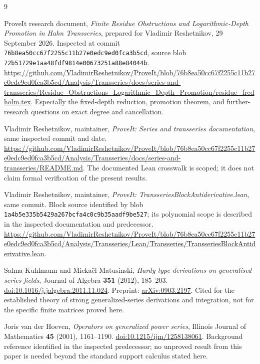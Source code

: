 \documentclass[11pt,a4paper]{article}
\numberwithin{equation}{section}
\theoremstyle{definition}
\theoremstyle{remark}
\theoremstyle{definition}
\newcommand{\snap}{76b8ea50cc67f2255c11b27e0edc9ed0fca3b5cd}
\begin{document}
\begin{thebibliography}{9}
\small\raggedright
{}
ProveIt research document, \emph{Finite Residue Obstructions and Logarithmic-Depth Promotion in Hahn Transseries}, prepared for Vladimir Reshetnikov, 29 September 2026. Inspected at commit \texttt{\snap}, source blob \texttt{72b51729e1aa48fdf9814e00673251a88e84044b}.
\url{https://github.com/VladimirReshetnikov/ProveIt/blob/76b8ea50cc67f2255c11b27e0edc9ed0fca3b5cd/Analysis/Transseries/docs/series-and-transseries/Residue_Obstructions_Logarithmic_Depth_Promotion/residue_fredholm.tex}.
Especially the fixed-depth reduction, promotion theorem, and further-research questions on exact degree and cancellation.

Vladimir Reshetnikov, maintainer, \emph{ProveIt: Series and transseries documentation}, same inspected commit and date.
\url{https://github.com/VladimirReshetnikov/ProveIt/blob/76b8ea50cc67f2255c11b27e0edc9ed0fca3b5cd/Analysis/Transseries/docs/series-and-transseries/README.md}.
The documented Lean crosswalk is scoped; it does not claim formal verification of the present results.

Vladimir Reshetnikov, maintainer, \emph{ProveIt: TransseriesBlockAntiderivative.lean}, same commit. Block source identified by blob \texttt{1a4b5e335b5429a267bcfa4c0c9b35aadf9be527}; its polynomial scope is described in the inspected documentation and predecessor.
\url{https://github.com/VladimirReshetnikov/ProveIt/blob/76b8ea50cc67f2255c11b27e0edc9ed0fca3b5cd/Analysis/Transseries/Lean/Transseries/TransseriesBlockAntiderivative.lean}.

Salma Kuhlmann and Micka\"el Matusinski,
\emph{Hardy type derivations on generalised series fields},
Journal of Algebra \textbf{351} (2012), 185--203.
\href{https://doi.org/10.1016/j.jalgebra.2011.11.024}{doi:10.1016/j.jalgebra.2011.11.024}.
Preprint: \href{https://arxiv.org/abs/0903.2197}{arXiv:0903.2197}.
Cited for the established theory of strong generalized-series derivations and integration, not for the specific finite matrices proved here.

Joris van der Hoeven,
\emph{Operators on generalized power series},
Illinois Journal of Mathematics \textbf{45} (2001), 1161--1190.
\href{https://doi.org/10.1215/ijm/1258138061}{doi:10.1215/ijm/1258138061}.
Background reference identified in the inspected predecessor; no unproved result from this paper is needed beyond the standard support calculus stated here.


\end{thebibliography}
\end{document}
